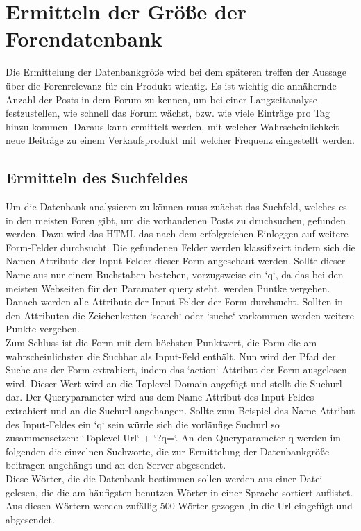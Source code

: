 \section{Ermitteln der Größe der Forendatenbank}
Die Ermittelung der Datenbankgröße wird bei dem späteren treffen der Aussage über die Forenrelevanz für ein Produkt wichtig.
Es ist wichtig die annähernde Anzahl der Posts in dem Forum zu kennen, um bei einer Langzeitanalyse festzustellen, wie schnell das Forum wächst, bzw. wie viele Einträge pro Tag hinzu kommen. Daraus kann ermittelt werden, mit welcher Wahrscheinlichkeit neue Beiträge zu einem Verkaufsprodukt mit welcher Frequenz eingestellt werden.\\
\subsection{Ermitteln des Suchfeldes}
Um die Datenbank analysieren zu können muss zuächst das Suchfeld, welches es in den meisten Foren gibt, um die vorhandenen Posts zu druchsuchen, gefunden werden.
Dazu wird das HTML das nach dem erfolgreichen Einloggen auf weitere Form-Felder durchsucht. Die gefundenen Felder werden klassifizeirt indem sich die Namen-Attribute der Input-Felder dieser Form angeschaut werden. Sollte dieser Name aus nur einem Buchstaben bestehen, vorzugsweise ein `q`, da das bei den meisten Webseiten für den Paramater query steht, werden Puntke vergeben.
Danach werden alle Attribute der Input-Felder der Form durchsucht. Sollten in den Attributen die Zeichenketten `search` oder `suche` vorkommen werden weitere Punkte vergeben.\\
Zum Schluss ist die Form mit dem höchsten Punktwert, die Form die am wahrscheinlichsten die Suchbar als Input-Feld enthält.
Nun wird der Pfad der Suche aus der Form extrahiert, indem das `action` Attribut der Form ausgelesen wird. Dieser Wert wird an die Toplevel Domain angefügt und stellt die Suchurl dar. Der Queryparameter wird aus dem Name-Attribut des Input-Feldes extrahiert und an die Suchurl angehangen. Sollte zum Beispiel das Name-Attribut des Input-Feldes ein `q` sein würde sich die vorläufige Suchurl so zusammensetzen: `Toplevel Url` + `?q=`. An den Queryparameter q werden im folgenden die einzelnen Suchworte, die zur Ermittelung der Datenbankgröße beitragen angehängt und an den Server abgesendet.\\
Diese Wörter, die die Datenbank bestimmen sollen werden aus einer Datei gelesen, die die am häufigsten benutzen Wörter in einer Sprache sortiert auflistet. Aus diesen Wörtern werden zufällig 500 Wörter gezogen ,in die Url eingefügt und abgesendet.\\
